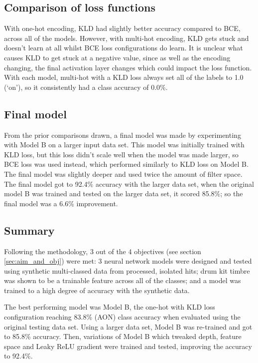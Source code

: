 \documentclass[12pt]{article}
\begin{document}
	\subsection{Comparison of loss functions}
	
	With one-hot encoding, KLD had slightly better accuracy compared to BCE, across all of the models. However, with multi-hot encoding, KLD gets stuck and doesn't learn at all whilst BCE loss configurations do learn. It is unclear what causes KLD to get stuck at a negative value, since as well as the encoding changing, the final activation layer changes which could impact the loss function. With each model, multi-hot with a KLD loss always set all of the labels to 1.0 (`on'), so it consistently had a class accuracy of 0.0\%.
	
	\subsection{Final model}
	
	From the prior comparisons drawn, a final model was made by experimenting with Model B on a larger input data set. This model was initially trained with KLD loss, but this loss didn't scale well when the model was made larger, so BCE loss was used instead, which performed similarly to KLD loss on Model B. The final model was slightly deeper and used twice the amount of filter space. The final model got to 92.4\% accuracy with the larger data set, when the original model B was trained and tested on the larger data set, it scored 85.8\%; so the final model was a 6.6\% improvement.
	
	\subsection{Summary}
	
	Following the methodology, 3 out of the 4 objectives (see section \ref{sec:aim_and_obj}) were met: 3 neural network models were designed and tested using synthetic multi-classed data from processed, isolated hits; drum kit timbre was shown to be a trainable feature across all of the classes; and a model was trained to a high degree of accuracy with the synthetic data.\medskip
	
	The best performing model was Model B, the one-hot with KLD loss configuration reaching 83.8\% (AON) class accuracy when evaluated using the original testing data set. Using a larger data set, Model B was re-trained and got to 85.8\% accuracy. Then, variations of Model B which tweaked depth, feature space and Leaky ReLU gradient were trained and tested, improving the accuracy to 92.4\%.\medskip
	
\end{document}
